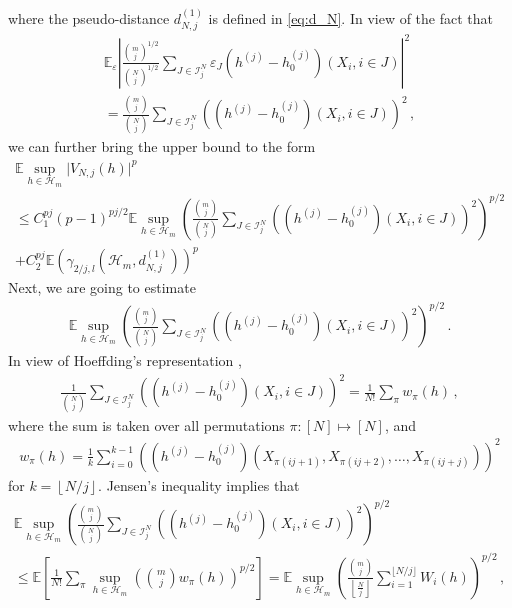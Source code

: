 \documentclass[12pt]{article}
\def\l{\left}
\def\r{\right}
\newcommand{\mb}{\mathbb}
\theoremstyle{thmstyletwo}%
\theoremstyle{thmstylethree}%
\begin{document}
    where the pseudo-distance $d_{N,j}^{(1)}$ is defined in \eqref{eq:d_N}. In view of the fact that
    \begin{multline*}
        \mb E_\varepsilon \l\lvert \frac{{m \choose j}^{1/2}}{{N \choose j}^{1/2}} \sum_{J \in \mathcal{I}^N_j} \varepsilon_J \l(h^{(j)} -h_0^{(j)}\r)\l(X_i, i \in J\r)\r\rvert ^ 2 \\
        = \frac{{m \choose j}}{{N \choose j}} \sum_{J \in \mathcal{I}^N_j} \l(\l(h^{(j)} -h_0^{(j)}\r)\l(X_i, i \in J\r)\r)^2\,,
    \end{multline*}
    we can further bring the upper bound to the form
    \begin{multline*}
        \mb E \sup_{h \in \mathcal{H}_m} \lvert V_{N,j}(h) \rvert ^ p 
        \\
        \leq C_1^{pj}(p-1)^{pj/2} \mb E \sup_{h \in \mathcal{H}_m} \l(\frac{{m \choose j}}{{N \choose j}} \sum_{J \in \mathcal{I}^N_j} \l(\l(h^{(j)} -h_0^{(j)}\r)\l(X_i, i \in J\r)\r)^2\r)^{p/2} 
        \\
        + C_2^{pj} \mb E \l(\gamma_{2/j, l}\l(\mathcal{H}_m, d_{N,j}^{(1)}\r)\r)^p
    \end{multline*}
    Next, we are going to estimate
    \begin{align*}
        \mb E \sup_{h \in \mathcal{H}_m} \l(\frac{{m \choose j}}{{N \choose j}} \sum_{J \in \mathcal{I}^N_j} \l(\l(h^{(j)} -h_0^{(j)}\r)\l(X_i, i \in J\r)\r)^2\r)^{p/2}\,.
    \end{align*}
    In view of Hoeffding's representation \citep{hoeffding1994probability},
    \begin{align*}
        \frac{1}{{N \choose j}}\sum_{J \in \mathcal{I}^N_j} \l(\l(h^{(j)} -h_0^{(j)}\r)\l(X_i, i \in J\r)\r)^2 = \frac{1}{N!} \sum_\pi w_{\pi}(h)\,,
    \end{align*}
    where the sum is taken over all permutations $\pi: [N] \mapsto [N]$, and
    \begin{align*}
        w_{\pi}(h) = \frac{1}{k}\sum_{i=0}^{k-1} \l(\l(h^{(j)} -h_0^{(j)}\r)\l(X_{\pi(ij+1)}, X_{\pi(ij+2)}, \ldots, X_{\pi(ij+j)}\r)\r)^2 
     \end{align*}
    for $k = \l\lfloor N/j \r\rfloor$. Jensen's inequality implies that
    \begin{multline*}
        \mb E \sup_{h \in \mathcal{H}_m} \l(\frac{{m \choose j}}{{N \choose j}} \sum_{J \in \mathcal{I}^N_j} \l(\l(h^{(j)} -h_0^{(j)}\r)\l(X_i, i \in J\r)\r)^2\r)^{p/2} 
        \\
        \leq \mb E \l[\frac{1}{N!}\sum_{\pi}\sup_{h \in \mathcal{H}_m} \l({m \choose j} w_{\pi}(h)\r)^{p/2}\r] 
        = \mb E \sup_{h \in \mathcal{H}_m} \l(\frac{{m \choose j}}{{\l\lfloor\frac{N}{j}\r\rfloor}}\sum_{i = 1}^{\lfloor N/j\rfloor} W_{i}(h)\r)^{p/2}\,,
    \end{multline*}
\end{document}
